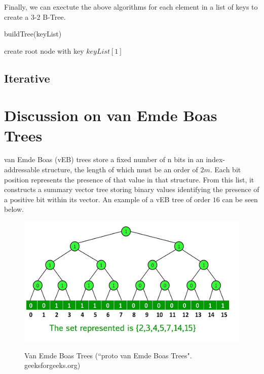 \documentclass{article}
\begin{document}
\pagebreak

        Finally, we can exectute the above algorithms for each element in a list of keys to create a 3-2 B-Tree.

        \begin{function}
            \caption{buildTree(keyList)}
            \DontPrintSemicolon


            create root node with key $keyList[1]$\;

        \end{function}

    \subsection*{Iterative}

\pagebreak

\section*{Discussion on van Emde Boas Trees}

van Emde Boas (vEB) trees store a fixed number of n bits in an index-addressable structure, the length of which must be an order of $2m$. Each bit position represents the presence of that value in that structure. From this list, it constructs a summary vector tree storing binary values identifying the presence of a positive bit within its vector. An example of a vEB tree of order $16$ can be seen below.

\begin{figure}[h]
    \centering
    \includegraphics[scale=0.5,keepaspectratio]{Images/vebtree.jpg}
    \label{fig:veb_tree}
    \caption{Van Emde Boas Trees (``proto van Emde Boas Trees". geeksforgeeks.org)}
\end{figure}
\end{document}
